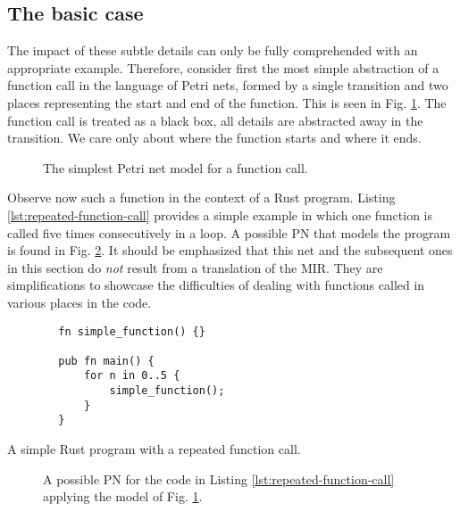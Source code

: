 \subsection{The basic case}

The impact of these subtle details can only
be fully comprehended with an appropriate example.
Therefore, consider first the most simple abstraction of a function call in
the language of Petri nets, formed by a single transition and
two places representing the start and end of the function.
This is seen in Fig. \ref{fig:simplest-function}.
The function call is treated as a black box,
all details are abstracted away in the transition.
We care only about where the function starts and where it ends.

\begin{figure}[!htb]
    \centering
    
    \caption{The simplest Petri net model for a function call.}
    \label{fig:simplest-function}
\end{figure}

Observe now such a function in the context of a Rust program.
Listing \ref{lst:repeated-function-call} provides a simple example
in which one function is called
five times consecutively in a  loop.
A possible \acrshort{PN} that models the program
is found in Fig. \ref{fig:repeated-function-call}.
It should be emphasized that
this net and the subsequent ones in this section
do \emph{not} result from a translation of the MIR.
They are simplifications to showcase the difficulties
of dealing with functions called in various places in the code.

\begin{listing}[!htb]
    \begin{verbatim}
        fn simple_function() {}

        pub fn main() {
            for n in 0..5 {
                simple_function();
            }
        }
    \end{verbatim}
    \caption{A simple Rust program with a repeated function call.}
    \label{lst:repeated-function-call}
\end{listing}

\begin{figure}[!htb]
    \centering
    
    \caption{A possible \acrshort{PN} for the code in Listing \ref{lst:repeated-function-call}
        applying the model of Fig. \ref{fig:simplest-function}.}
    \label{fig:repeated-function-call}
\end{figure}

